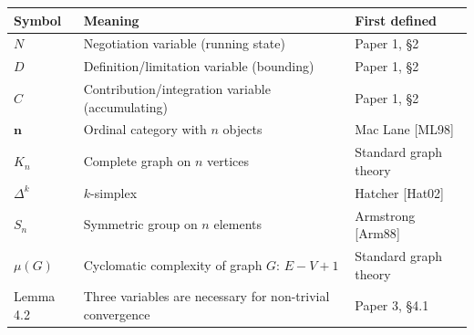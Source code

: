 \documentclass[12pt]{article}
\begin{document}
\begin{longtable}[]{@{}
  >{\raggedright\arraybackslash}p{}
  >{\raggedright\arraybackslash}p{}
  >{\raggedright\arraybackslash}p{}@{}}
\toprule\noalign{}
\begin{minipage}[b]{\linewidth}\raggedright
Symbol
\end{minipage} & \begin{minipage}[b]{\linewidth}\raggedright
Meaning
\end{minipage} & \begin{minipage}[b]{\linewidth}\raggedright
First defined
\end{minipage} \\
\midrule\noalign{}
\endhead
\bottomrule\noalign{}
\endlastfoot
\(N\) & Negotiation variable (running state) & Paper 1, §2 \\
\(D\) & Definition/limitation variable (bounding) & Paper 1, §2 \\
\(C\) & Contribution/integration variable (accumulating) & Paper 1,
§2 \\
\(\mathbf{n}\) & Ordinal category with \(n\) objects & Mac Lane
{[}ML98{]} \\
\(K_n\) & Complete graph on \(n\) vertices & Standard graph theory \\
\(\Delta^k\) & \(k\)-simplex & Hatcher {[}Hat02{]} \\
\(S_n\) & Symmetric group on \(n\) elements & Armstrong {[}Arm88{]} \\
\(\mu(G)\) & Cyclomatic complexity of graph \(G\): \(E - V + 1\) &
Standard graph theory \\
Lemma 4.2 & Three variables are necessary for non-trivial convergence &
Paper 3, §4.1 \\
\end{longtable}
\end{document}

